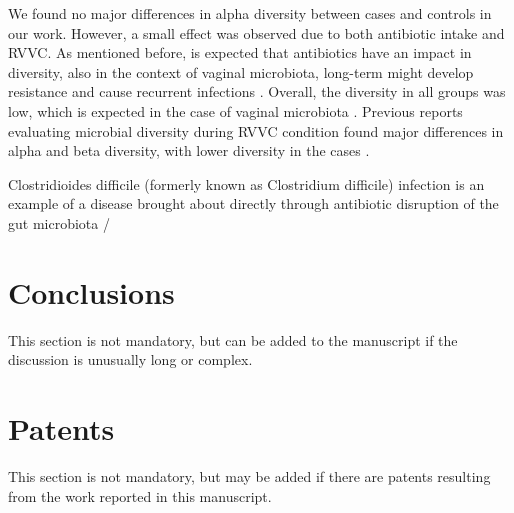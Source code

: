 \documentclass[biotech,article,submit,pdftex,moreauthors]{Definitions/mdpi}
\begin{document}
We found no major differences in alpha diversity between cases and controls in our work. However, a small effect was observed due to both antibiotic intake and RVVC. As mentioned before, is expected that antibiotics have an impact in diversity, also in the context of vaginal microbiota, long-term might develop resistance and cause recurrent infections \cite{@lev-sagieVaginalMicrobiomeTransplantation2019}. Overall, the diversity in all groups was low, which is expected in the case of vaginal microbiota \cite{@sunVulvovaginalCandidiasisVaginal2023}. Previous reports evaluating microbial diversity during RVVC condition found major differences in alpha and beta diversity, with lower diversity in the cases \cite{@ceccaraniDiversityVaginalMicrobiome2019; @liuDiverseVaginalMicrobiomes2013}.



Clostridioides difficile (formerly known as Clostridium difficile) infection is an example of a disease brought about directly through antibiotic disruption of the gut microbiota /\cite{@theriotAntibioticinducedShiftsMouse2014}


\section{Conclusions}

This section is not mandatory, but can be added to the manuscript if the discussion is unusually long or complex.

\section{Patents}

This section is not mandatory, but may be added if there are patents resulting from the work reported in this manuscript.

\vspace{6pt} 


\end{document}
